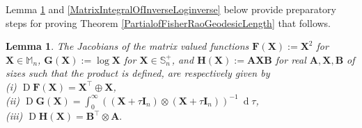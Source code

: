 \documentclass[letterpaper,10pt,twocolumn,conference]{ieeeconf}
\newtheorem{lemma}{Lemma}
\newcommand{\bbA}{\bm{A}}
\newcommand{\bbB}{\bm{B}}
\newcommand{\bbI}{\bm{I}}
\newcommand{\bbF}{\bm{F}}
\newcommand{\bbG}{\bm{G}}
\newcommand{\bbH}{\bm{H}}
\newcommand{\bbX}{\bm{X}}
\newcommand{\Jacobian}{\operatorname{D}}
\newcommand{\differential}{\operatorname{d}}
\begin{document}
Lemma \ref{ThreeMatrixFuncJacobianLemma} and \ref{MatrixIntegralOfInverseLoginverse} below provide preparatory steps for proving Theorem \ref{PartialofFisherRaoGeodesicLength} that follows.

\begin{lemma}\label{ThreeMatrixFuncJacobianLemma}
The Jacobians of the matrix valued functions $\bbF(\bbX):=\bbX^{2}$ for $\bbX \in \mathbb{M}_{n}$, $\bbG(\bbX):=\log\bbX$ for $\bbX\in\mathbb{S}_{n}^{+}$, and $\bbH(\bbX):=\bbA\bbX\bbB$ for real $\bbA,\bbX,\bbB$ of sizes such that the product is defined, are respectively given by\\
(i) $\Jacobian\bbF(\bbX) = \bbX^{\top} \oplus \bbX$,\\
(ii) $\Jacobian\bbG(\bbX) = \int_{0}^{\infty}((\bbX + \tau\bbI_{n}) \otimes (\bbX + \tau\bbI_{n}))^{-1}\:\differential\tau$,\\
(iii) $\Jacobian\bbH(\bbX) = \bbB^{\top} \otimes \bbA.$ 	
\end{lemma}
\end{document}
